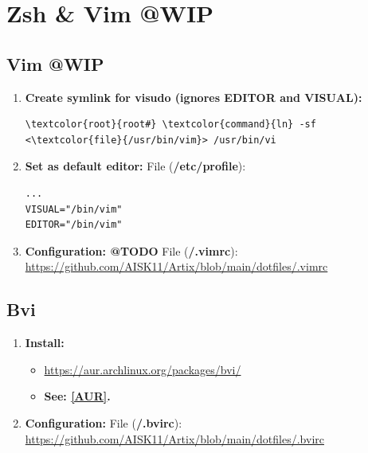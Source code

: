 \documentclass[10pt, a4paper, onecolumn, oneside, titlepage, openany]{book}
\begin{document}
\chapter{Zsh \& Vim @WIP}
\section{Vim @WIP}
\begin{enumerate}
    \item \textbf{Create symlink for visudo (ignores EDITOR and VISUAL):}
\begin{Verbatim}[commandchars=\\\{\}]
\textcolor{root}{root#} \textcolor{command}{ln} -sf <\textcolor{file}{/usr/bin/vim}> /usr/bin/vi
\end{Verbatim}
    \item \textbf{Set as default editor:}
\newline File (\textbf{\textcolor{file}{/etc/profile}}):
\begin{Verbatim}[commandchars=\\\{\}]
...
VISUAL="/bin/vim"
EDITOR="/bin/vim"
\end{Verbatim}
    \item \textbf{Configuration: @TODO}
\newline File (\textbf{\textcolor{file}{\texttildelow/.vimrc}}):
\newline \url{https://github.com/AISK11/Artix/blob/main/dotfiles/.vimrc}
\end{enumerate}

\section{Bvi}
\begin{enumerate}
    \item \textbf{Install:}
    \begin{itemize}
        \item \url{https://aur.archlinux.org/packages/bvi/}
        \item \textbf{See: \underline{\ref{AUR}}.}
    \end{itemize}
    \item \textbf{Configuration:}
\newline File (\textbf{\textcolor{file}{\texttildelow/.bvirc}}):
\newline \url{https://github.com/AISK11/Artix/blob/main/dotfiles/.bvirc}
\end{enumerate}
\end{document}
